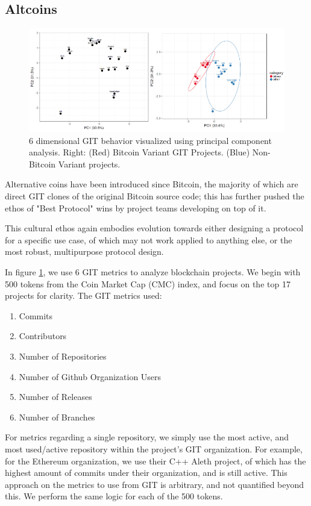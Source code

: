 \documentclass[12pt, titlepage, twocolumn]{report}
\begin{document}
\subsection{Altcoins}

\begin{figure}[ht]
\centering
	\includegraphics[width=\textwidth]{git_ana_both}
	\caption{6 dimensional GIT behavior visualized using principal component analysis. Right: (Red) Bitcoin Variant GIT Projects. (Blue) Non-Bitcoin Variant projects.}
	\label{git_ana_both}
\end{figure}


Alternative coins have been introduced since Bitcoin, the majority of which are direct GIT clones of the original Bitcoin source code; this has further pushed the ethos of "Best Protocol" wins by project teams developing on top of it.

This cultural ethos again embodies evolution towards either designing a protocol for a specific use case, of which may not work applied to anything else, or the most robust, multipurpose protocol design.

In figure \ref{git_ana_both}, we use 6 GIT metrics to analyze blockchain projects. We begin with 500 tokens from the Coin Market Cap (CMC) index, and focus on the top 17 projects for clarity. The GIT metrics used:

\begin{enumerate}
	\item Commits
	\item Contributors
	\item Number of Repositories
	\item Number of Github Organization Users
	\item Number of Releases
	\item Number of Branches
\end{enumerate}

For metrics regarding a single repository, we simply use the most active, and most used/active repository within the project's GIT organization. For example, for the Ethereum organization, we use their C++ Aleth project, of which has the highest amount of commits under their organization, and is still active. This approach on the metrics to use from GIT is arbitrary, and not quantified beyond this. We perform the same logic for each of the 500 tokens. 
\end{document}
